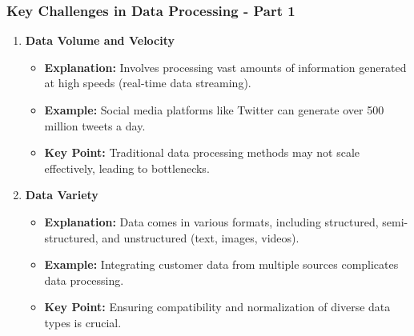 \documentclass[aspectratio=169]{beamer}
\begin{document}
\begin{frame}[fragile]
    \frametitle{Key Challenges in Data Processing - Part 1}
    
    \begin{enumerate}
        \item \textbf{Data Volume and Velocity}
            \begin{itemize}
                \item \textbf{Explanation:} Involves processing vast amounts of information generated at high speeds (real-time data streaming).
                \item \textbf{Example:} Social media platforms like Twitter can generate over 500 million tweets a day.
                \item \textbf{Key Point:} Traditional data processing methods may not scale effectively, leading to bottlenecks.
            \end{itemize}
        
        \item \textbf{Data Variety}
            \begin{itemize}
                \item \textbf{Explanation:} Data comes in various formats, including structured, semi-structured, and unstructured (text, images, videos).
                \item \textbf{Example:} Integrating customer data from multiple sources complicates data processing.
                \item \textbf{Key Point:} Ensuring compatibility and normalization of diverse data types is crucial.
            \end{itemize}
    \end{enumerate}
\end{frame}
\end{document}
